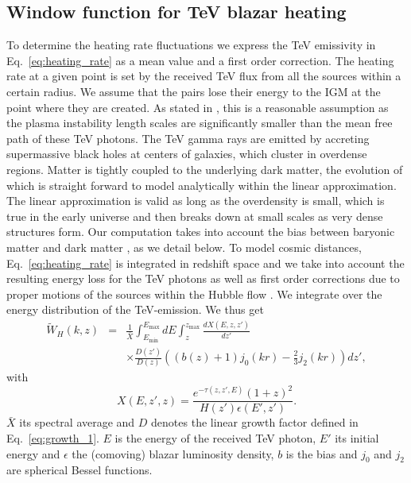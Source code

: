 \documentclass[twocolumns]{emulateapj}
\begin{document}
\subsection{Window function for TeV blazar heating}\label{sec:window}
To determine the heating rate fluctuations we express the TeV emissivity in Eq.~\eqref{eq:heating_rate} as a mean value and a first order correction. The heating rate at a given point is set by the received TeV flux from all the sources within a certain radius. We assume that the pairs lose their energy to the IGM at the point where they are created. As stated in \citet{2012ApJ...752...22B}, this is a reasonable assumption as the plasma instability length scales are significantly smaller than the mean free path of these TeV photons.
The TeV gamma rays are emitted by accreting supermassive black holes at centers of galaxies, which cluster in overdense regions. Matter is tightly coupled to the underlying dark matter, the evolution of which is straight forward to model analytically within the linear approximation. The linear approximation is valid as long as the overdensity is small, which is true in the early universe and then breaks down at small scales as very dense structures form. Our computation takes into account the bias between baryonic matter and dark matter \citep{1996MNRAS.282..347M}, as we detail below.
To model cosmic distances, Eq.~\eqref{eq:heating_rate} is integrated in redshift space and we take into account the resulting energy loss for the TeV photons as well as first order corrections due to proper motions of the sources within the Hubble flow \citep{1987MNRAS.227....1K}. We integrate over the energy distribution of the TeV-emission. We thus get
\begin{eqnarray}
\label{eq:window}
\tilde{W}_H(k,z)&=&\frac{1}{\bar{X}}\int_{E_{\mathrm{min}}}^{E_{\mathrm{max}}}dE\int_z^{z_{\mathrm{max}}}\frac{dX(E,z,z')}{dz'} \\
&&\times \frac{D(z')}{D(z)}\left((b(z)+1)j_0(kr)-\frac{2}{3}j_2(kr)\right)dz', \nonumber
\end{eqnarray}
with
\begin{equation}
\label{eq:define_X}
X(E,z',z)=\frac{e^{-\tau(z,z',E)}(1+z)^2}{H(z')\epsilon(E',z')}.
\end{equation}
$\bar{X}$ its spectral average and $D$ denotes the linear growth factor defined in Eq.~\eqref{eq:growth_1}. $E$ is the energy of the received TeV photon, $E'$ its initial energy and $\epsilon$ the (comoving) blazar luminosity density, $b$ is the bias and $j_0$ and $j_2$ are spherical Bessel functions.
\end{document}
